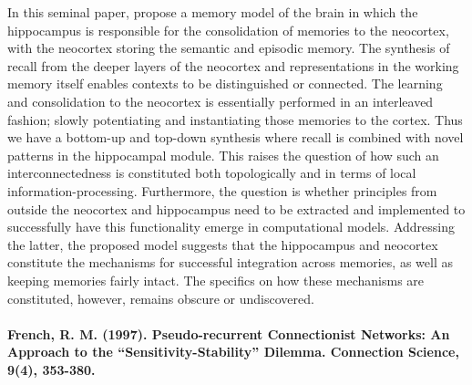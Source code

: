 In this seminal paper, \cite{McClelland1995} propose a memory model of the brain in which the hippocampus is responsible for the consolidation of memories to the neocortex, with the neocortex storing the semantic and episodic memory. The synthesis of recall from the deeper layers of the neocortex and representations in the working memory itself enables contexts to be distinguished or connected. The learning and consolidation to the neocortex is essentially performed in an interleaved fashion; slowly potentiating and instantiating those memories to the cortex. Thus we have a bottom-up and top-down synthesis where recall is combined with novel patterns in the hippocampal module. This raises the question of how such an interconnectedness is constituted both topologically and in terms of local information-processing. Furthermore, the question is whether principles from outside the neocortex and hippocampus need to be extracted and implemented to successfully have this functionality emerge in computational models. Addressing the latter, the proposed model suggests that the hippocampus and neocortex constitute the mechanisms for successful integration across memories, as well as keeping memories fairly intact. The specifics on how these mechanisms are constituted, however, remains obscure or undiscovered.
\\
\\
\textbf{French, R. M. (1997). Pseudo-recurrent Connectionist Networks: An Approach to the “Sensitivity-Stability” Dilemma. Connection Science, 9(4), 353-380.}

